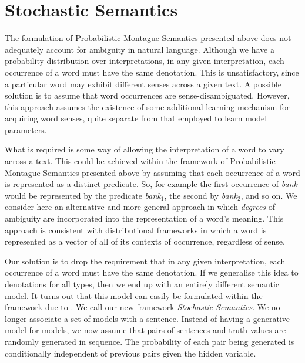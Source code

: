 \documentclass[11pt]{article}
\theoremstyle{definition}
\begin{document}
\section{Stochastic Semantics}

The formulation of Probabilistic Montague Semantics presented above does not adequately account for ambiguity in natural language. Although we have a probability distribution over interpretations, in any given interpretation, each occurrence of a word must have the same denotation. This is unsatisfactory, since a particular word may exhibit different senses across a given text.  A  possible solution is to assume that word occurrences are sense-disambiguated.  However, this approach assumes the existence of some additional learning mechanism for acquiring word senses, quite separate from that employed to learn model parameters. 

What is required is some way of allowing the interpretation of a word to vary across a text. This could be achieved within the framework of Probabilistic Montague Semantics presented above by assuming that each occurrence of a word is represented as a distinct predicate. So, for example the first occurrence of {\em bank} would be represented by the predicate {\em bank}$_1$, the second by {\em bank}$_2$, and so on.  We consider here an alternative and more general approach in which \emph{degrees} of ambiguity are incorporated into the representation of a word's meaning. This approach is consistent with distributional  frameworks in which a word is represented as a vector of all of its contexts of occurrence, regardless of sense. 

Our solution is to drop the requirement that in any given interpretation, each occurrence of a word must have the same denotation. If we generalise this idea to denotations for all types, then we end up with an entirely different semantic model. It turns out that this model can easily be formulated within the framework due to . We call our new framework \emph{Stochastic Semantics}.  We no longer
associate a set of models with a sentence. Instead of having a
generative model for models, we now assume that pairs of sentences and
truth values are randomly generated in sequence. The probability of
each pair being generated is conditionally independent of previous
pairs given the hidden variable.
\end{document}
